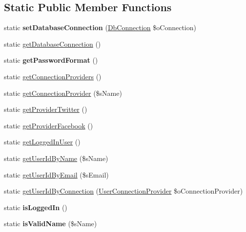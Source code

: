 \subsection*{Static Public Member Functions}
\begin{DoxyCompactItemize}
\item 
\hypertarget{class_user_manager_a342ba30508701915c02485940d180098}{static {\bfseries set\-Database\-Connection} (\hyperlink{class_db_connection}{Db\-Connection} \$o\-Connection)}\label{class_user_manager_a342ba30508701915c02485940d180098}

\item 
static \hyperlink{class_user_manager_af48c2ab0c753b8b9be7bdb2719862840}{get\-Database\-Connection} ()
\item 
\hypertarget{class_user_manager_aa773ec703ee755e8ecdd2c7ba2e053ba}{static {\bfseries get\-Password\-Format} ()}\label{class_user_manager_aa773ec703ee755e8ecdd2c7ba2e053ba}

\item 
static \hyperlink{class_user_manager_a1f3e3b461c8aabc71317dce4ff976ed9}{get\-Connection\-Providers} ()
\item 
static \hyperlink{class_user_manager_a5a6d55e5e7919ef0f1ac87ca5a1c9d25}{get\-Connection\-Provider} (\$s\-Name)
\item 
static \hyperlink{class_user_manager_aa5b0aab1733a73687f4579b023570649}{get\-Provider\-Twitter} ()
\item 
static \hyperlink{class_user_manager_ae332cc489631cd349e2868cae0a536e5}{get\-Provider\-Facebook} ()
\item 
static \hyperlink{class_user_manager_a4dbbac5935e78431b8296c4cb5146a58}{get\-Logged\-In\-User} ()
\item 
static \hyperlink{class_user_manager_a4dee48e6e2b29fa51f81551463caca53}{get\-User\-Id\-By\-Name} (\$s\-Name)
\item 
static \hyperlink{class_user_manager_ad50dff9f59c5e7ac023d3588d66e7783}{get\-User\-Id\-By\-Email} (\$s\-Email)
\item 
static \hyperlink{class_user_manager_a06068f695ff6ac95dc73f51073f1b204}{get\-User\-Id\-By\-Connection} (\hyperlink{class_user_connection_provider}{User\-Connection\-Provider} \$o\-Connection\-Provider)
\item 
\hypertarget{class_user_manager_acb233e0f52390a4e9a787ba41f681341}{static {\bfseries is\-Logged\-In} ()}\label{class_user_manager_acb233e0f52390a4e9a787ba41f681341}

\item 
\hypertarget{class_user_manager_a6314cd815f30c10a0becf2b6cc9ff7ae}{static {\bfseries is\-Valid\-Name} (\$s\-Name)}\label{class_user_manager_a6314cd815f30c10a0becf2b6cc9ff7ae}


\end{DoxyCompactItemize}
